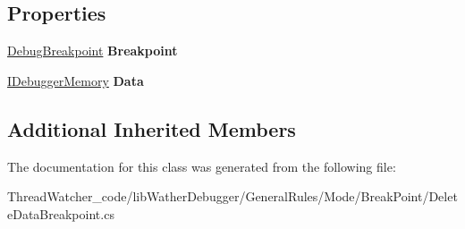 \subsection*{Properties}
\begin{DoxyCompactItemize}
\item 
\hypertarget{class_watcher_1_1_debugger_1_1_general_rules_1_1_mode_1_1_break_point_1_1_delete_data_breakpoint_a552f8236a4b6f1a629a0ec5b5e1eb400}{\hyperlink{classlib_wather_debugger_1_1_breakpoint_1_1_debug_breakpoint}{Debug\+Breakpoint} {\bfseries Breakpoint}}\label{class_watcher_1_1_debugger_1_1_general_rules_1_1_mode_1_1_break_point_1_1_delete_data_breakpoint_a552f8236a4b6f1a629a0ec5b5e1eb400}

\item 
\hypertarget{class_watcher_1_1_debugger_1_1_general_rules_1_1_mode_1_1_break_point_1_1_delete_data_breakpoint_a1ed8bb5e5adc4ff2dca350802763a2c5}{\hyperlink{interfacelib_utilities_1_1_i_debugger_memory}{I\+Debugger\+Memory} {\bfseries Data}}\label{class_watcher_1_1_debugger_1_1_general_rules_1_1_mode_1_1_break_point_1_1_delete_data_breakpoint_a1ed8bb5e5adc4ff2dca350802763a2c5}

\end{DoxyCompactItemize}
\subsection*{Additional Inherited Members}


The documentation for this class was generated from the following file\+:\begin{DoxyCompactItemize}
\item 
Thread\+Watcher\+\_\+code/lib\+Wather\+Debugger/\+General\+Rules/\+Mode/\+Break\+Point/Delete\+Data\+Breakpoint.\+cs\end{DoxyCompactItemize}
